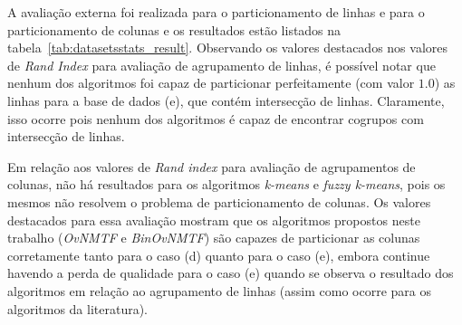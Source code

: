 \documentclass[
    12pt,                %
    oneside,            %
    a4paper,            %
    english,            %
    brazil                %
    ]{abntex2ppgsi}
\begin{document}
A avaliação externa foi realizada para o particionamento de linhas e para o particionamento de colunas e os resultados estão listados na tabela~\ref{tab:datasetsstats_result}. Observando os valores destacados nos valores de \textit{Rand Index} para avaliação de agrupamento de linhas, é possível notar que nenhum dos algoritmos foi capaz de particionar perfeitamente (com valor $1.0$) as linhas para a base de dados (e), que contém intersecção de linhas. Claramente, isso ocorre pois nenhum dos algoritmos é capaz de encontrar cogrupos com intersecção de linhas.


Em relação aos valores de \textit{Rand index} para avaliação de agrupamentos de colunas, não há resultados para os algoritmos \textit{k-means} e \textit{fuzzy k-means}, pois os mesmos não resolvem o problema de particionamento de colunas. Os valores destacados para essa avaliação mostram que os algoritmos propostos neste trabalho (\textit{OvNMTF} e \textit{BinOvNMTF}) são capazes de particionar as colunas corretamente tanto para o caso (d) quanto para o caso (e), embora continue havendo a perda de qualidade para o caso (e) quando se observa o resultado dos algoritmos em relação ao agrupamento de linhas (assim como ocorre para os algoritmos da literatura).




\end{document}
